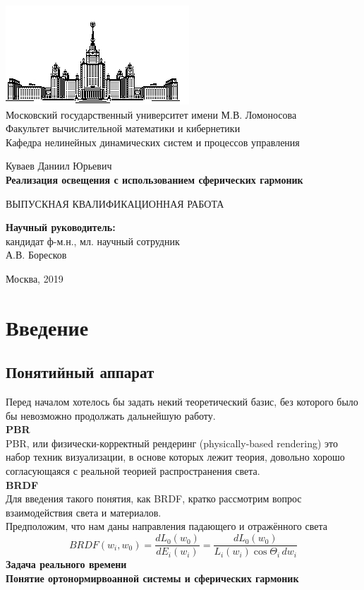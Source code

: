 \documentclass[oneside,final,12pt]{extreport}
\begin{document}
\begin{titlepage}

\begin{centering}
\vskip0.4cm
\includegraphics{GZ} \\
\vskip0.8cm
Московский государственный университет имени М.В. Ломоносова \\
Факультет вычислительной математики и кибернетики \\
Кафедра нелинейных динамических систем и процессов управления \\
\vskip2cm
\begin{Large} 
Куваев Даниил Юрьевич \\
\bigskip
{\bfseries Реализация освещения с использованием сферических гармоник} \\
\end{Large} 
\bigskip
ВЫПУСКНАЯ КВАЛИФИКАЦИОННАЯ  РАБОТА \\
\end{centering}
\vfill
\begin{flushright}
{\bfseries Научный руководитель:} \\
кандидат ф-м.н., мл. научный сотрудник \\
А.В. Боресков \\
\end{flushright}
\vfill
\centerline{Москва, 2019}

\end{titlepage}
\setcounter{page}{2}
\tableofcontents
\chapter{Введение}
\section{Понятийный аппарат}
Перед началом хотелось бы задать некий теоретический базис, без которого было бы невозможно продолжать дальнейшую работу. \\
{\bfseries PBR} \\
PBR, или физически-корректный рендеринг (physically-based rendering) это набор техник визуализации, в основе которых лежит теория, довольно хорошо согласующаяся с реальной теорией распространения света. \\
{\bfseries BRDF} \\
Для введения такого понятия, как BRDF, кратко рассмотрим вопрос взаимодействия света и материалов. \\
Предположим, что нам даны направления падающего и отражённого света 
\[ 
BRDF(w_i,w_0)=\frac{dL_0(w_0)}{dE_i(w_i)}=\frac{dL_0(w_0)}{L_i(w_i)\cos \Theta_i \, dw_i} 
\]
{\bfseries Задача реального времени} \\
{\bfseries Понятие ортонормирвоанной системы и сферических гармоник} \\
\end{document}

